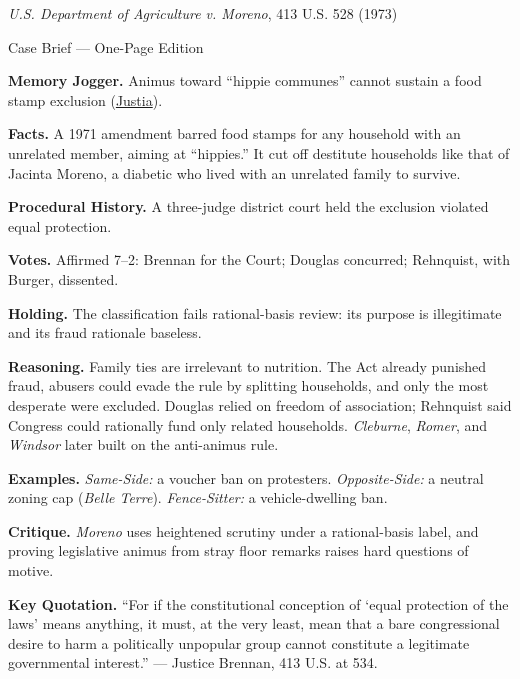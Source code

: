 \documentclass[12pt]{article}
\begin{document}
\begin{center}
{\Large \textit{U.S. Department of Agriculture v. Moreno}, 413 U.S. 528 (1973)\par}
\vspace{0.3em}
{\normalsize Case Brief --- One-Page Edition\par}
\end{center}

\textbf{Memory Jogger.} Animus toward ``hippie communes'' cannot sustain a food stamp exclusion (\href{https://supreme.justia.com/cases/federal/us/413/528/}{Justia}).

\textbf{Facts.} A 1971 amendment barred food stamps for any household with an unrelated member, aiming at ``hippies.'' It cut off destitute households like that of Jacinta Moreno, a diabetic who lived with an unrelated family to survive.

\textbf{Procedural History.} A three-judge district court held the exclusion violated equal protection.

\textbf{Votes.} Affirmed 7--2: Brennan for the Court; Douglas concurred; Rehnquist, with Burger, dissented.

\textbf{Holding.} The classification fails rational-basis review: its purpose is illegitimate and its fraud rationale baseless.

\textbf{Reasoning.} Family ties are irrelevant to nutrition. The Act already punished fraud, abusers could evade the rule by splitting households, and only the most desperate were excluded. Douglas relied on freedom of association; Rehnquist said Congress could rationally fund only related households. \textit{Cleburne}, \textit{Romer}, and \textit{Windsor} later built on the anti-animus rule.

\textbf{Examples.} \emph{Same-Side:} a voucher ban on protesters. \emph{Opposite-Side:} a neutral zoning cap (\textit{Belle Terre}). \emph{Fence-Sitter:} a vehicle-dwelling ban.

\textbf{Critique.} \textit{Moreno} uses heightened scrutiny under a rational-basis label, and proving legislative animus from stray floor remarks raises hard questions of motive.

\textbf{Key Quotation.} ``For if the constitutional conception of `equal protection of the laws' means anything, it must, at the very least, mean that a bare congressional desire to harm a politically unpopular group cannot constitute a legitimate governmental interest.'' --- Justice Brennan, 413 U.S. at 534.
\end{document}
